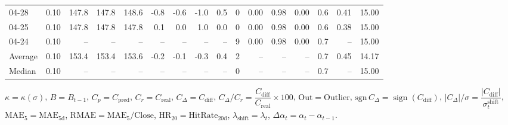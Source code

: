 \begin{threeparttable}
{\begin{tabular}{lrrrrrrrrrrrrrrr}
  04-28 &     0.10 & 147.8 & 147.8 & 148.6 &       -0.8 &           -0.6 &                     -1.0 &                 0.5 &              0 &       0.00 &      0.98 &           0.00 &              0.6 &            0.41 &                  15.00 \\
  04-25 &     0.10 & 147.8 & 147.8 & 147.8 &        0.1 &            0.0 &                      1.0 &                 0.0 &              0 &       0.00 &      0.98 &           0.00 &              0.6 &            0.38 &                  15.00 \\
  04-24 &     0.10 &    -- &    -- &    -- &         -- &             -- &                       -- &                  -- &              9 &       0.00 &      0.98 &           0.00 &              0.7 &              -- &                  15.00 \\
Average &     0.10 & 153.4 & 153.4 & 153.6 &       -0.2 &           -0.1 &                     -0.3 &                 0.4 &              2 &         -- &        -- &             -- &              0.7 &            0.45 &                  14.17 \\
 Median &     0.10 &    -- &    -- &    -- &         -- &             -- &                       -- &                  -- &              0 &         -- &        -- &             -- &              0.7 &              -- &                  15.00 \\
\bottomrule
\end{tabular}
}
\begin{tablenotes}\footnotesize
\item $\kappa=\kappa(\sigma)$, $B=B_{t-1}$, $C_p=C_{\text{pred}}$, $C_r=C_{\text{real}}$, $C_\Delta=C_{\text{diff}}$, $C_\Delta/C_r=\dfrac{C_{\text{diff}}}{C_{\text{real}}}\times100$, $\mathrm{Out}=\text{Outlier}$, $\mathrm{sgn}\,C_\Delta=\operatorname{sign}(C_{\text{diff}})$, $|C_\Delta|/\sigma=\dfrac{|C_{\text{diff}}|}{\sigma_t^{\text{shift}}}$, $\mathrm{MAE}_5=\mathrm{MAE}_{5\text{d}}$, $\mathrm{RMAE}= \mathrm{MAE}_5 / \text{Close}$, $\mathrm{HR}_{20}=\mathrm{HitRate}_{20\text{d}}$, 
$\lambda_{\text{shift}}=\lambda_t$, 
$\Delta\alpha_t=\alpha_t-\alpha_{t-1}$.
\end{tablenotes}
\end{threeparttable}
\endgroup

